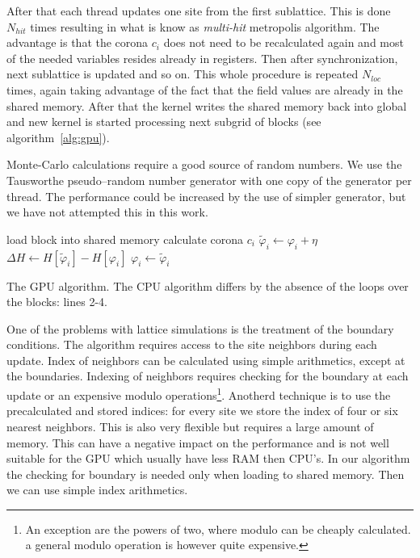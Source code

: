 \documentclass[a4paper]{llncs}
\newcommand{\vphi}{\varphi}
\begin{document}
After that each thread updates one site
from the first sublattice. This is done $N_{hit}$ times resulting in
what is know as {\em multi-hit} metropolis algorithm. The advantage is
that the corona $c_i$ does not need to be recalculated again and most
of the needed variables resides already in registers.  Then after
synchronization, next sublattice is updated and so on. This whole
procedure is repeated $N_{loc}$ times, again taking advantage of
the fact that the field values are already in the shared memory. After
that the kernel writes the shared memory back into global and new
kernel is started processing next subgrid of blocks (see
algorithm~\ref{alg:gpu}).

Monte-Carlo calculations require a good source of random numbers. We
use the Tausworthe pseudo--random number
generator\cite{howes_thomas07} with one copy of the generator per
thread. The performance could be increased by the use of simpler
generator, but we have not attempted this in this work.

\begin{algorithm}
\begin{algorithmic}[1]
\State load block  into shared memory
\State calculate corona $c_i$ 
\State $\widetilde{\vphi}_i \gets \vphi_i+\eta$
\State $\Delta H \gets H[\widetilde{\vphi}_i]-H[\vphi_i]$
\State $\vphi_i \gets \widetilde{\vphi}_i$
\EndIf
\EndFor
\EndFor 
{}
\EndFor
\EndFor
\EndFor
\EndFor
\end{algorithmic}
\caption{\label{alg:gpu} The GPU algorithm. The CPU algorithm differs
  by the absence of the loops over the blocks: lines 2-4.}
\end{algorithm}


One of the problems with lattice simulations is the treatment of the boundary conditions. The
algorithm requires access to the site neighbors during each update. Index of neighbors can be
calculated using simple arithmetics, except at the boundaries. Indexing of neighbors requires
checking for the boundary at each update or an expensive modulo operations\footnote{An exception are
  the powers of two, where modulo can be cheaply calculated. a general modulo operation is however
  quite expensive. }. Anotherd technique is to use the precalculated and stored indices: for every
site we store the index of four or six nearest neighbors. This is also very flexible but requires a
large amount of memory. This can have a negative impact on the performance and is not well suitable
for the GPU which usually have less RAM then CPU's. In our algorithm the checking for boundary is
needed only when loading to shared memory. Then we can use simple index arithmetics.
\end{document}

